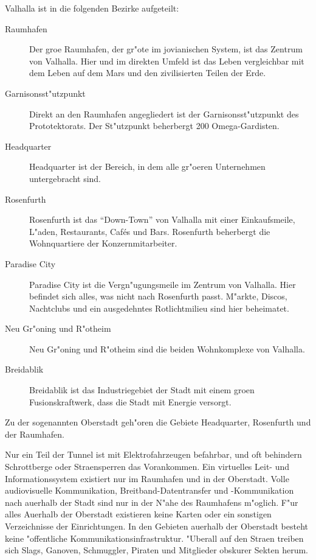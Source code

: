 
Valhalla ist in die folgenden Bezirke aufgeteilt:

\begin{description}
    \item[Raumhafen] Der gro\3e Raumhafen, der gr"o\3te im jovianischen System, ist das Zentrum von Valhalla. Hier und im direkten Umfeld 
        ist das Leben vergleichbar mit dem Leben auf dem Mars und den zivilisierten Teilen der Erde.
    \item [Garnisonsst"utzpunkt] Direkt an den Raumhafen angegliedert ist der Garnisonsst"utzpunkt des Prototektorats. Der St"utzpunkt 
        beherbergt 200 Omega-Gardisten. 
    \item [Headquarter] Headquarter ist der Bereich, in dem alle gr"o\3eren Unternehmen untergebracht sind.
    \item [Rosenfurth] Rosenfurth ist das ``Down-Town'' von Valhalla mit einer Einkaufsmeile, L"aden, Restaurants, Caf\'es und Bars.    
        Rosenfurth beherbergt die Wohnquartiere der Konzernmitarbeiter.
    \item [Paradise City] Paradise City ist die Vergn"ugungsmeile im Zentrum von Valhalla. Hier befindet sich alles, was nicht nach 
        Rosenfurth passt. M"arkte, Discos, Nachtclubs und ein ausgedehntes Rotlichtmilieu sind hier beheimatet.
    \item [Neu Gr"oning und R"otheim] Neu Gr"oning und R"otheim sind die beiden Wohnkomplexe von Valhalla.
    \item [Breidablik] Breidablik ist das Industriegebiet der Stadt mit einem gro\3en Fusionskraftwerk, dass die Stadt mit Energie 
        versorgt.
\end{description}

Zu der sogenannten Oberstadt geh"oren die Gebiete Headquarter, Rosenfurth und der Raumhafen.

Nur ein Teil der Tunnel ist mit Elektrofahrzeugen befahrbar, und oft behindern Schrottberge oder Stra\3ensperren das Vorankommen. Ein virtuelles Leit- und Informationssystem existiert nur im Raumhafen und in der Oberstadt. Volle audiovisuelle Kommunikation, Breitband-Datentransfer und -Kommunikation nach au\3erhalb der Stadt sind nur in der N"ahe des Raumhafens m"oglich. F"ur alles Au\3erhalb der Oberstadt existieren keine Karten oder ein sonstigen Verzeichnisse der Einrichtungen. In den Gebieten au\3erhalb der Oberstadt besteht keine "offentliche Kommunikationsinfrastruktur. "Uberall auf den Stra\3en treiben sich Slags, Ganoven, Schmuggler, Piraten und Mitglieder obskurer Sekten herum.

